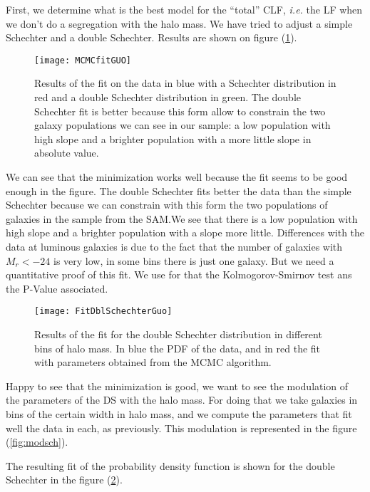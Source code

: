 First, we determine what is the best model for the ``total'' CLF, \textit{i.e.} the LF when we don't do a segregation with the halo
mass. We have tried to adjust a simple Schechter and a double Schechter. Results are shown on figure (\ref{fig:fitguo}).
\begin{figure}[ht]
    \centering
    \texttt{[image: MCMCfitGUO]}
    \caption{\footnotesize{}Results of the fit on the data in blue with a Schechter distribution in red and a double Schechter
    distribution in green. The double Schechter fit is better because this form allow to constrain the two galaxy populations we
    can see in our sample: a low population with high slope and a brighter population with a more little slope in absolute
    value.}
\label{fig:fitguo}
\end{figure}
We can see that the minimization works well because the fit seems to be good enough in the figure. The double Schechter fits better
the data than the simple Schechter because we can constrain with this form the two populations of galaxies in the sample from the
\citet{Guo+11} SAM.\@ We see that there is a low population with high slope and a brighter population with a slope more little.
Differences with the data at luminous galaxies is due to the fact that the number of galaxies with $M_r<-24$ is very low, in some
bins there is just one galaxy. But we need a quantitative proof of this fit. We use for that the Kolmogorov-Smirnov test ans the
P-Value associated.
\begin{figure}[H]
    \centering
    \texttt{[image: FitDblSchechterGuo]}
    \caption{Results of the fit for the double Schechter distribution in different bins of halo mass. In blue the
    PDF of the data, and in red the fit with parameters obtained from the MCMC algorithm.}
\label{fig:fitguodblsch}
\end{figure}

Happy to see that the minimization is good, we want to see the modulation of the parameters of the DS with the halo mass. For doing
that we take galaxies in bins of the certain width in halo mass, and we compute the parameters that fit well the data in each, as
previously. This modulation is represented in the figure (\ref{fig:modsch}).
\begin{figure*}[p]
    \centering
    \begin{minipage}{\linewidth}
    \centering
    \end{minipage}
    \begin{minipage}{\linewidth}
    \centering
    \end{minipage}
    \caption{\footnotesize{}Modulation of the parameters of both Schechter and double Schechter luminosity distributions with
    the halo mass.}
\label{fig:modsch}
\end{figure*}
The resulting fit of the probability density function is shown for the double Schechter in the figure (\ref{fig:fitguodblsch}).

